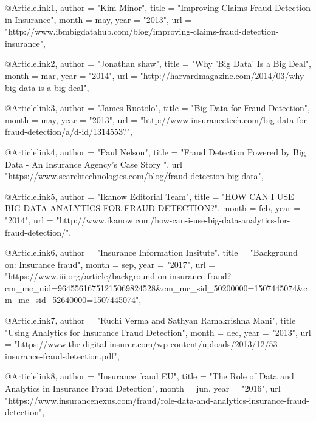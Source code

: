 
@Article{link1,
  author 	= "Kim Minor",
  title 	= "Improving Claims Fraud Detection in Insurance",
  month 	= may,
  year 		= "2013",
  url		= "http://www.ibmbigdatahub.com/blog/improving-claims-fraud-detection-insurance",
}

@Article{link2,
  author 	= "Jonathan shaw",
  title 	= "Why 'Big Data' Is a Big Deal",
  month 	= mar,
  year 		= "2014",
  url		= "http://harvardmagazine.com/2014/03/why-big-data-is-a-big-deal",
}

@Article{link3,
  author 	= "James Ruotolo",
  title 	= "Big Data for Fraud Detection",
  month 	= may,
  year 		= "2013",
  url		= "http://www.insurancetech.com/big-data-for-fraud-detection/a/d-id/1314553?",
}

@Article{link4,
  author 	= "Paul Nelson",
  title 	= "Fraud Detection Powered by Big Data - An Insurance Agency's Case Story
",
  url		= "https://www.searchtechnologies.com/blog/fraud-detection-big-data",
}


@Article{link5,
  author 	= "Ikanow Editorial Team",
  title 	= "HOW CAN I USE BIG DATA ANALYTICS FOR FRAUD DETECTION?",
  month 	= feb,
  year 		= "2014",
  url		= "http://www.ikanow.com/how-can-i-use-big-data-analytics-for-fraud-detection/",
}

@Article{link6,
  author 	= "Insurance Information Insitute",
  title 	= "Background on: Insurance fraud",
  month 	= sep,
  year 		= "2017",
  url		= "https://www.iii.org/article/background-on-insurance-fraud?cm_mc_uid=96455616751215069824528&cm_mc_sid_50200000=1507445074&cm_mc_sid_52640000=1507445074",
}

@Article{link7,
  author 	= "Ruchi Verma and Sathyan Ramakrishna Mani",
  title 	= "Using Analytics for Insurance Fraud Detection",
  month 	= dec,
  year 		= "2013",
  url		= "https://www.the-digital-insurer.com/wp-content/uploads/2013/12/53-insurance-fraud-detection.pdf",
}


@Article{link8,
  author 	= "Insurance fraud EU",
  title 	= "The Role of Data and Analytics in Insurance Fraud Detection",
  month 	= jun,
  year 		= "2016",
  url		= "https://www.insurancenexus.com/fraud/role-data-and-analytics-insurance-fraud-detection",
}
